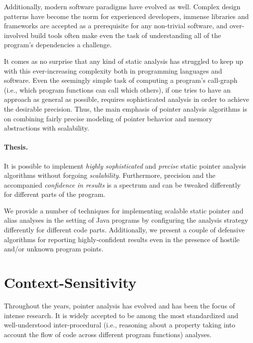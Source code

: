 Additionally, modern software paradigms have evolved as well. Complex design patterns have become the norm for experienced developers, immense libraries and frameworks are accepted as a prerequisite for any non-trivial software, and over-involved build tools often make even the task of understanding all of the program's dependencies a challenge.

It comes as no surprise that any kind of static analysis has struggled to keep up with this ever-increasing complexity both in programming languages and software. Even the seemingly simple task of computing a program's call-graph (i.e., which program functions can call which others), if one tries to have an approach as general as possible, requires sophisticated analysis in order to achieve the desirable precision. Thus, the main emphasis of pointer analysis algorithms is on combining fairly precise modeling of pointer behavior and memory abstractions with scalability.

\paragraph*{Thesis.}
\begin{displayquote}
It is possible to implement \emph{highly sophisticated} and \emph{precise} static pointer analysis algorithms without forgoing \emph{scalability}. Furthermore, precision and the accompanied \emph{confidence in results} is a spectrum and can be tweaked differently for different parts of the program.
\end{displayquote}

We provide a number of techniques for implementing scalable static pointer and alias analyses in the setting of Java programs by configuring the analysis strategy differently for different code parts. Additionally, we present a couple of defensive algorithms for reporting highly-confident results even in the presence of hostile and/or unknown program points.


\section{Context-Sensitivity}

Throughout the years, pointer analysis has evolved and has been the focus of intense research. It is widely accepted to be among the most standardized and well-understood inter-procedural (i.e., reasoning about a property taking into account the flow of code across different program functions) analyses.


